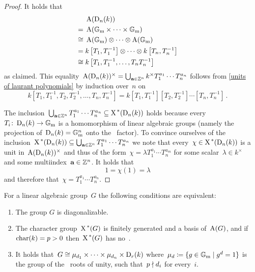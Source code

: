 \begin{proof}
  It holds that
  \begin{align*}
           &  \operatorname{A}(\operatorname{D}_n(k)) \\
        ={}&  \operatorname{A}(\mathbb{G}_{\text{m}} \times \dotsb \times \mathbb{G}_{\text{m}})  \\
    \cong{}&  \operatorname{A}(\mathbb{G}_{\text{m}}) \otimes \dotsb \otimes \operatorname{A}(\mathbb{G}_{\text{m}}) \\
        ={}&  k\left[ T_1, T_1^{-1} \right]
              \otimes \dotsb \otimes
              k\left[ T_n, T_n^{-1} \right]  \\
    \cong{}&  k\left[ T_1, T_1^{-1}, \dotsc, T_n T_n^{-1} \right]
  \end{align*}
  as claimed.
  This equality~$\operatorname{A}(\operatorname{D}_n(k))^\times = \bigcup_{\mathbf{a} \in \mathbb{Z}^n} k^\times T_1^{a_1} \dotsm T_n^{a_n}$ follows from \cref{units of laurant polynomials} by induction over~$n$ on
  \[
      k\left[ T_1, T_1^{-1}, T_2, T_2^{-1}, \dotsc, T_n, T_n^{-1} \right]
    = k\left[ T_1, T_1^{-1} \right]
       \left[ T_2, T_2^{-1} \right]
       \dotsm
       \left[ T_n, T_n^{-1} \right] \,.
  \]
  
  The inclusion~$\bigcup_{\mathbf{a} \in \mathbb{Z}^n} T_1^{a_1} \dotsm T_n^{a_n} \subseteq \operatorname{X}^{\,*}(\operatorname{D}_n(k))$ holds because every~$T_i \colon \operatorname{D}_n(k) \to \mathbb{G}_{\text{m}}$ is a homomorphism of linear algebraic groups (namely the projection of~$\operatorname{D}_n(k) = \mathbb{G}_{\text{m}}^n$ onto the~ factor).
  To convince ourselves of the inclusion~$\operatorname{X}^{\,*}(\operatorname{D}_n(k)) \subseteq \bigcup_{\mathbf{a} \in \mathbb{Z}^n} T_1^{a_1} \dotsm T_n^{a_n}$ we note that every~$\chi \in \operatorname{X}^{\,*}(\operatorname{D}_n(k))$ is a unit in~$\operatorname{A}(\operatorname{D}_n(k))^\times$ and thus of the form~$\chi = \lambda T_1^{a_1} \dotsm T_n^{a_m}$ for some scalar~$\lambda \in k^\times$ and some multiindex~$\mathbf{a} \in \mathbb{Z}^n$.
  It holds that
  \[
    1 = \chi(1) = \lambda
  \]
  and therefore that~$\chi = T_1^{a_1} \dotsm T_n^{a_n}$.
\end{proof}


\begin{theorem}
  For a linear algebraic group~$G$ the following conditions are equivalent:
  \begin{enumerate}
    \item
      \label{G is diagonalizable}
      The group $G$ is diagonalizable.
    \item
      \label{X(G) is nice}
      The character group~$\operatorname{X}^{\,*}(G)$ is finitely generated and a basis of~$\operatorname{A}(G)$, and if~$\operatorname{char}(k) = p > 0$ then~$\operatorname{X}^{\,*}(G)$ has no~.
    \item
      \label{G is products of things}
      It holds that~$G \cong \mu_{d_1} \times \dotsb \times \mu_{d_n} \times \operatorname{D}_r(k)$ where~$\mu_d \defined \{g \in \Gmult \suchthat g^d = 1\}$ is the group of the~ roots of unity, such that~$p \mathrel{\nmid} d_i$ for every~$i$.
  \end{enumerate}
\end{theorem}



